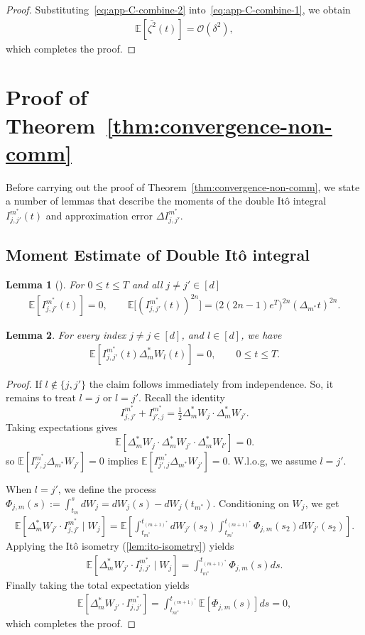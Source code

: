 \documentclass[11pt, a4paper, onecolumn]{article}
\newcommand{\E}{\mathbb{E}}
\newcommand{\m}{m}
\newcommand{\calO}{\mathcal{O}}
\newcommand{\ms}{{m^*}}
\newcommand{\mos}{{(m+1)^*}}
\newcommand{\Dms}{{\Delta^{*}_{m}}}
\newcommand{\Ijjpms}{ {I_{j,j'}^{\ms}} }
\newcommand{\Ijpjms}{ {I_{j',j}^{\ms}} }
\newcommand{\DIjjpms}{\Delta{I_{j,j'}^{\ms}}}
\newcommand{\Phjms}{\Phi_{j,\m}}
\newtheorem{lemma}{Lemma}
\begin{document}
\begin{appendices}
\begin{proof}
Substituting~\cref{eq:app-C-combine-2} into~\cref{eq:app-C-combine-1}, we obtain
\begin{align*}
     \E[\bar{\zeta^2}(t)]  = \calO(\delta^2),
\end{align*}
which completes the proof. 
\end{proof}

\section{Proof of Theorem~\ref{thm:convergence-non-comm}}\label{app:non-commute}
Before carrying out the proof of Theorem~\ref{thm:convergence-non-comm}, we state a number of lemmas that describe the moments of the double It\^o integral $\Ijjpms(t)$ and approximation error $\DIjjpms$.
\subsection{Moment Estimate of Double It\^o integral}
\begin{lemma}[\cite{kloeden1992numerical}]\label{lem:I2N} For $0 \le t \le T$ and all $j \neq j'\in[d]$
\begin{align*}
    \E[\Ijjpms(t)] = 0,
    \qquad
    \E\bigl[(\Ijjpms(t))^{2n}\bigr]
    =
    \bigl(2(2n-1)e^{T}\bigr)^{2n}(\Delta_\ms t)^{2n}.
\end{align*}
\end{lemma}

\begin{lemma}\label{lem:I1W}
     For every index $j \neq j\in [d]$, and $l\in [d]$, we have
     \begin{align*}
         \E[\Ijjpms(t)\Dms W_l(t)]=0,  \qquad 0\le t\le T.
     \end{align*}
\end{lemma}
\begin{proof}
If $l\notin\{j,j'\}$ the claim follows immediately from independence. So, it remains to treat $l=j$ or $l=j'$.  Recall the identity
\[
\Ijjpms + \Ijpjms = \tfrac{1}{2} \Dms W_j \cdot \Dms W_{j'}.
\]
Taking expectations gives
\[
\E[\Dms W_j \cdot \Dms W_{j'} \cdot \Dms W_{l'}] = 0.
\]
so $\mathbb{E}[\Ijpjms\Delta_\ms W_{j'}]=0$ implies $\mathbb{E}[\Ijpjms\Delta_\ms W_{j'}]=0$. W.l.o.g, we  assume $l=j'$.

When $ l = j' $, we define the process $ \Phjms(s) := \int_{t_\m}^{s} dW_j = dW_j(s) - dW_j(t_\ms)$. Conditioning on $ W_j $, we get
\begin{align*}
    \E[\Dms W_{j'} \cdot \Ijjpms \mid W_j] = \E\left[ \int_{t_\ms}^{t_\mos} dW_{j'}(s_2) \int_{t_\ms}^{t_\mos} \Phjms(s_2) dW_{j'}(s_2) \right].
\end{align*}
Applying the It\^o isometry (\cref{lem:ito-isometry}) yields
\begin{align*}
    \E[\Dms W_{j'} \cdot \Ijjpms \mid W_j]  = \int_{t_\ms}^{t_\mos} \Phjms(s)  ds.
\end{align*}
Finally taking the total expectation yields
\begin{align*} 
    \E[\Dms W_{j'} \cdot \Ijjpms] = \int_{t_\ms}^{t_\mos} \E[\Phjms(s)]  ds = 0,
\end{align*}
which completes the proof.
\end{proof}


\end{appendices}
\end{document}
